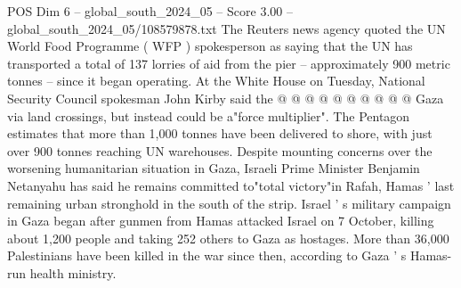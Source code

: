 \begin{textsample}{POS Dim 6 – global\_south\_2024\_05 – Score 3.00 – global\_south\_2024\_05/108579878.txt}
The Reuters news agency quoted the UN World Food Programme ( WFP ) spokesperson as saying that the UN has transported a total of 137 lorries of aid from the pier -- approximately 900 metric tonnes -- since it began operating.
At the White House on Tuesday, National Security Council spokesman John Kirby said the @ @ @ @ @ @ @ @ @ @ Gaza via land crossings, but instead could be a"force multiplier".
The Pentagon estimates that more than 1,000 tonnes have been delivered to shore, with just over 900 tonnes reaching UN warehouses.
Despite mounting concerns over the worsening humanitarian situation in Gaza, Israeli Prime Minister Benjamin Netanyahu has said he remains committed to"total victory"in Rafah, Hamas ' last remaining urban stronghold in the south of the strip.
Israel ' s military campaign in Gaza began after gunmen from Hamas attacked Israel on 7 October, killing about 1,200 people and taking 252 others to Gaza as hostages.
More than 36,000 Palestinians have been killed in the war since then, according to Gaza ' s Hamas-run health ministry.

\end{textsample}

